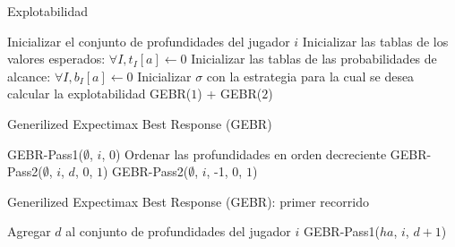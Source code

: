 \begin{algorithm}
\caption{Explotabilidad}
\label{algorithm:explotabilidad}
\begin{algorithmic}[1]
    \State Inicializar el conjunto de profundidades del jugador $i$
    \State Inicializar las tablas de los valores esperados: $\forall I, t_I[a] \leftarrow 0$
    \State Inicializar las tablas de las probabilidades de alcance: $\forall I, b_I[a] \leftarrow 0$
    \State Inicializar $\sigma$ con la estrategia para la cual se desea calcular la explotabilidad
    \State
        \State \Return GEBR($1$) + GEBR($2$)
    \EndFunction
\end{algorithmic}
\end{algorithm}

\begin{algorithm}
\caption{Generilized Expectimax Best Response (GEBR)}
\label{algorithm:GEBR}
\begin{algorithmic}[1]
        \State GEBR-Pass1($\emptyset$, $i$, $0$)
        \State Ordenar las profundidades en orden decreciente
            \State GEBR-Pass2($\emptyset$, $i$, $d$, $0$, $1$)
        \EndFor
        \State \Return GEBR-Pass2($\emptyset$, $i$, -1, $0$, $1$)
    \EndFunction
\end{algorithmic}
\end{algorithm}

\begin{algorithm}
\caption{Generilized Expectimax Best Response (GEBR): primer recorrido}
\label{algorithm:gebr-pass1}
\begin{algorithmic}[1]
            \State \Return
        \EndIf
            \State Agregar $d$ al conjunto de profundidades del jugador $i$
        \EndIf
            \State GEBR-Pass1($ha$, $i$, $d+1$)
        \EndFor
    \EndFunction
\end{algorithmic}
\end{algorithm}


